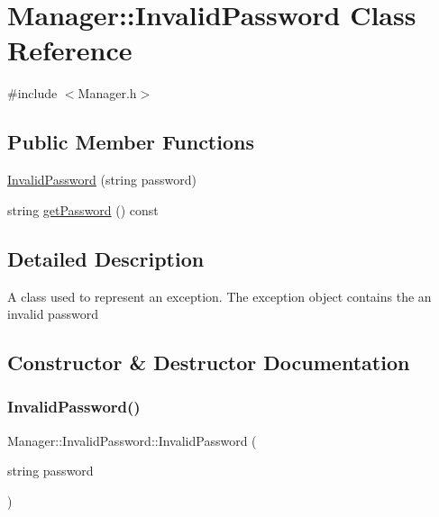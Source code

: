 \hypertarget{class_manager_1_1_invalid_password}{}\section{Manager\+:\+:Invalid\+Password Class Reference}
\label{class_manager_1_1_invalid_password}


{\ttfamily \#include $<$Manager.\+h$>$}

\subsection*{Public Member Functions}
\begin{DoxyCompactItemize}
\item 
\hyperlink{class_manager_1_1_invalid_password_aaaab4d7339254bcb118d3ab0f3ba312c}{Invalid\+Password} (string password)
\item 
string \hyperlink{class_manager_1_1_invalid_password_a50dac6f3a960996704aad8613aace04b}{get\+Password} () const
\end{DoxyCompactItemize}


\subsection{Detailed Description}
A class used to represent an exception. The exception object contains the an invalid password 

\subsection{Constructor \& Destructor Documentation}
\hypertarget{class_manager_1_1_invalid_password_aaaab4d7339254bcb118d3ab0f3ba312c}{}\label{class_manager_1_1_invalid_password_aaaab4d7339254bcb118d3ab0f3ba312c} 
\subsubsection{\texorpdfstring{Invalid\+Password()}{InvalidPassword()}}
{\footnotesize\ttfamily Manager\+::\+Invalid\+Password\+::\+Invalid\+Password (\begin{DoxyParamCaption}\item[{string}]{password }\end{DoxyParamCaption})\hspace{0.3cm}{\ttfamily [inline]}}

